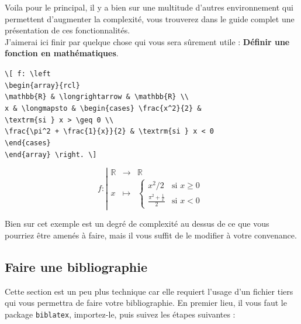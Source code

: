 \documentclass[11pt]{article}				%
\begin{document}
Voila pour le principal, il y a bien sur une multitude d'autres environnement qui permettent d'augmenter la complexité, vous trouverez dans le guide complet une présentation de ces fonctionnalités. \\
J'aimerai ici finir par quelque chose qui vous sera sûrement utile : \textbf{Définir une fonction en mathématiques}.
\begin{multicols}{2}
	
\verb|\[ f: \left | \\
\verb|\begin{array}{rcl}| \\
\verb|\mathbb{R} & \longrightarrow & \mathbb{R} \\|	\\
\verb|x & \longmapsto & \begin{cases} \frac{x^2}{2} &| \\ \verb|\textrm{si } x > \geq 0 \\| \\
\verb|\frac{\pi^2 + \frac{1}{x}}{2} & \textrm{si } x < 0 | \\ 
\verb|\end{cases}| \\
\verb|\end{array} \right. \]|
	
\columnbreak	

\[
f: \left|
\begin{array}{rcl}
	\mathbb{R} & \longrightarrow & \mathbb{R} \\
	x & \longmapsto & \begin{cases} x^2/2 & \textrm{si } x \geq 0 \\
	\frac{\pi^2 + \frac{1}{x}}{2} & \textrm{si } x < 0 \end{cases}
\end{array} \right. \]
\end{multicols}

Bien sur cet exemple est un degré de complexité au dessus de ce que vous pourriez être amenés à faire, mais il vous suffit de le modifier à votre convenance.


\clearpage

\subsection*{Faire une bibliographie}

Cette section est un peu plus technique car elle requiert l'usage d'un fichier tiers qui vous permettra de faire votre bibliographie. En premier lieu, il vous faut le package \verb|biblatex|, importez-le, puis suivez les étapes suivantes :
\end{document}
